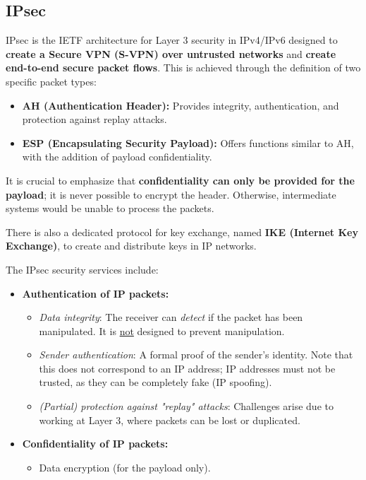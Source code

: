 \subsection{IPsec}

IPsec is the IETF architecture for Layer 3 security in IPv4/IPv6 designed to \textbf{create a Secure VPN (S-VPN) over untrusted networks} and \textbf{create end-to-end secure packet flows}. This is achieved through the definition of two specific packet types:

\begin{itemize}
    \item \textbf{AH (Authentication Header):}
          Provides integrity, authentication, and protection against replay attacks.
    \item \textbf{ESP (Encapsulating Security Payload):}
          Offers functions similar to AH, with the addition of payload confidentiality.
\end{itemize}

It is crucial to emphasize that \textbf{confidentiality can only be provided for the payload}; it is never possible to encrypt the header. Otherwise, intermediate systems would be unable to process the packets.

There is also a dedicated protocol for key exchange, named \textbf{IKE (Internet Key Exchange)}, to create and distribute keys in IP networks.

The IPsec security services include:

\begin{itemize}
    \item \textbf{Authentication of IP packets:}
          \begin{itemize}
              \item \textit{Data integrity}: The receiver can \textit{detect} if the packet has been manipulated. It is \underline{not} designed to prevent manipulation.
              \item \textit{Sender authentication}: A formal proof of the sender's identity. Note that this does not correspond to an IP address; IP addresses must not be trusted, as they can be completely fake (IP spoofing).
              \item \textit{(Partial) protection against "replay" attacks}: Challenges arise due to working at Layer 3, where packets can be lost or duplicated.
          \end{itemize}
    \item \textbf{Confidentiality of IP packets:}
          \begin{itemize}
              \item Data encryption (for the payload only).
          \end{itemize}
\end{itemize}


